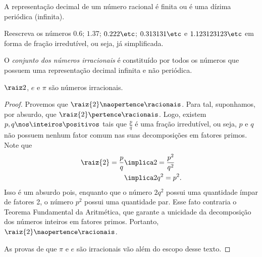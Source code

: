 \begin{remark}
	A representação decimal de um número racional é finita ou é uma dízima periódica (infinita).
\end{remark}

\begin{exercise}
	Reescreva os números $0.6$; $1.37$; $0.222\etc$; $0.313131 \etc$ e $1.123123123 \etc$ em forma de fração irredutível, ou seja, já simplificada.
\end{exercise}

\begin{definition}
	O \emph{conjunto dos números irracionais} é constituído por todos os números que possuem uma representação decimal infinita e não periódica.
\end{definition}

\begin{example}
	$\raiz 2$, $e$ e $\pi$ são números irracionais.
\end{example}

\begin{proof}
	Provemos que $\raiz{2} \naopertence \racionais$. Para tal, suponhamos, por absurdo, que $\raiz{2} \pertence \racionais$. Logo, existem $p, q \nos \inteiros\positivos$ tais que $\frac p q$ é uma fração irredutível, ou seja, $p$ e $q$ não possuem nenhum fator comum nas suas decomposições em fatores primos. Note que
	\begin{align*}
		\raiz{2} = \frac{p}{q} &\implica    2 = \frac{p^2}{q^2} \\
		                       &\implica 2q^2 = p^2.
	\end{align*}
	Isso é um absurdo pois, enquanto que o número $2q^2$ possui uma quantidade ímpar de fatores 2, o número $p^2$ possui uma quantidade par. Esse fato contraria o Teorema Fundamental da Aritmética, que garante a unicidade da decomposição dos números inteiros em fatores primos. Portanto, $\raiz{2} \naopertence \racionais$.

	As provas de que $\pi$ e $e$ são irracionais vão além do escopo desse texto. 
\end{proof}

